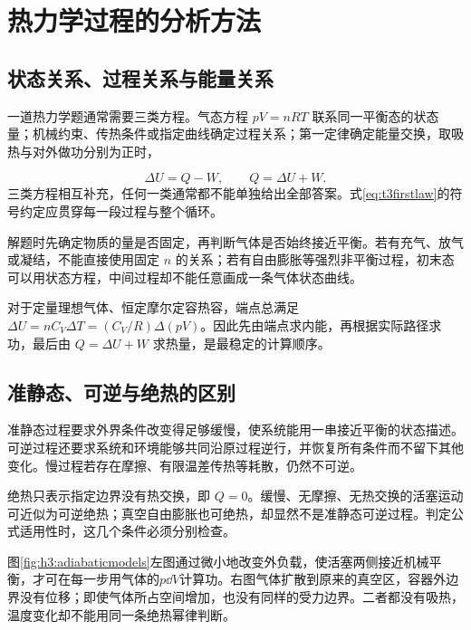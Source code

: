 \section{热力学过程的分析方法}
\subsection{状态关系、过程关系与能量关系}
一道热力学题通常需要三类方程。气态方程 $pV=nRT$ 联系同一平衡态的状态量；机械约束、传热条件或指定曲线确定过程关系；第一定律确定能量交换，取吸热与对外做功分别为正时，

\begin{equation}\label{eq:t3firstlaw}
 \Delta U=Q-W,\qquad Q=\Delta U+W.
\end{equation}
三类方程相互补充，任何一类通常都不能单独给出全部答案。式\eqref{eq:t3firstlaw}的符号约定应贯穿每一段过程与整个循环。

解题时先确定物质的量是否固定，再判断气体是否始终接近平衡。若有充气、放气或凝结，不能直接使用固定 $n$ 的关系；若有自由膨胀等强烈非平衡过程，初末态可以用状态方程，中间过程却不能任意画成一条气体状态曲线。

对于定量理想气体、恒定摩尔定容热容，端点总满足 $\Delta U=nC_V\Delta T=(C_V/R)\Delta(pV)$。因此先由端点求内能，再根据实际路径求功，最后由 $Q=\Delta U+W$ 求热量，是最稳定的计算顺序。

\subsection{准静态、可逆与绝热的区别}
准静态过程要求外界条件改变得足够缓慢，使系统能用一串接近平衡的状态描述。可逆过程还要求系统和环境能够共同沿原过程逆行，并恢复所有条件而不留下其他变化。慢过程若存在摩擦、有限温差传热等耗散，仍然不可逆。

绝热只表示指定边界没有热交换，即 $Q=0$。缓慢、无摩擦、无热交换的活塞运动可近似为可逆绝热；真空自由膨胀也可绝热，却显然不是准静态可逆过程。判定公式适用性时，这几个条件必须分别检查。

图\ref{fig:h3:adiabaticmodels}左图通过微小地改变外负载，使活塞两侧接近机械平衡，才可在每一步用气体的$p\dd V$计算功。右图气体扩散到原来的真空区，容器外边界没有位移；即使气体所占空间增加，也没有同样的受力边界。二者都没有吸热，温度变化却不能用同一条绝热幂律判断。



